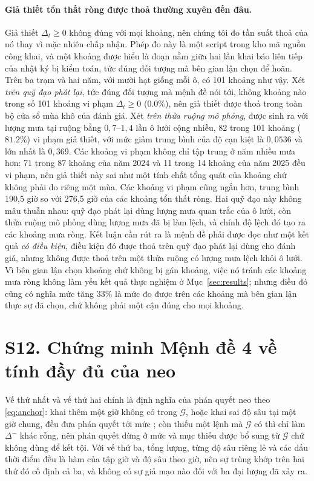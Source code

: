 \paragraph*{Giả thiết tổn thất ròng được thoả thường xuyên đến đâu.}
Giả thiết $\Delta_t\ge0$ không đúng với mọi khoảng, nên chúng tôi đo tần suất
thoả của nó thay vì mặc nhiên chấp nhận. Phép đo này là một script trong kho mã nguồn
công khai, và một khoảng được hiểu là đoạn nằm giữa hai lần khai báo liên tiếp của nhật
ký bị kiểm toán, tức đúng đối tượng mà bên gian lận chọn để hoãn. Trên ba trạm và hai
năm, với mười hạt giống mỗi ô, có 101 khoảng như vậy. Xét \emph{trên quỹ đạo phát lại},
tức đúng đối tượng mà mệnh đề nói tới, không khoảng nào trong số 101 khoảng vi phạm
$\Delta_t\ge0$ ($0.0\%$), nên giả thiết được thoả trong toàn bộ cửa sổ mùa khô của
đánh giá. Xét \emph{trên thửa ruộng mô phỏng}, được sinh ra với lượng mưa tại ruộng bằng
$0{,}7$--$1{,}4$ lần ô lưới cộng nhiễu, 82 trong 101 khoảng ($81.2\%$) vi phạm giả
thiết, với mức giảm trung bình của độ cạn kiệt là $0{,}0536$ và lớn nhất là $0{,}369$.
Các khoảng vi phạm không chỉ tập trung ở năm nhiều mưa hơn: 71 trong 87 khoảng của năm
2024 và 11 trong 14 khoảng của năm 2025 đều vi phạm, nên giả thiết này sai như một tính
chất tổng quát của khoảng chứ không phải do riêng một mùa. Các khoảng vi phạm cũng ngắn
hơn, trung bình 190{,}5 giờ so với 276{,}5 giờ của các khoảng tổn thất ròng. Hai quỹ đạo
này không mâu thuẫn nhau: quỹ đạo phát lại dùng lượng mưa quan trắc của ô lưới, còn thửa
ruộng mô phỏng dùng lượng mưa đã bị làm lệch, và chính độ lệch đó tạo ra các khoảng mưa
ròng. Kết luận cần rút ra là mệnh đề phải được đọc như một kết quả \emph{có điều kiện},
điều kiện đó được thoả trên quỹ đạo phát lại dùng cho đánh giá, nhưng không được thoả
trên một thửa ruộng có lượng mưa lệch khỏi ô lưới. Vì bên gian lận chọn khoảng chứ không
bị gán khoảng, việc nó tránh các khoảng mưa ròng không làm yếu kết quả thực nghiệm ở
Mục~\ref{sec:results}; nhưng điều đó cũng có nghĩa mức tăng $33\%$ là mức đo được trên
các khoảng mà bên gian lận thực sự đã chọn, chứ không
phải một cận đúng cho mọi khoảng.

\section*{S12. Chứng minh Mệnh đề 4 về tính đầy đủ của neo}

Vế thứ nhất và vế thứ hai chính là định nghĩa của phán quyết neo theo
\eqref{eq:anchor}: khai thêm một giờ không có trong $\mathcal{G}$, hoặc khai sai độ sâu
tại một giờ chung, đều đưa phán quyết tới mức ; còn thiếu một lệnh mà
$\mathcal{G}$ có thì chỉ làm $\Delta^{-}$ khác rỗng, nên phán quyết dừng ở mức
 và mục thiếu được bổ sung từ $\mathcal{G}$ chứ không dùng để kết tội.
Với vế thứ ba, tổng lượng, từng độ sâu riêng lẻ và các dấu thời điểm đều là hàm của tập
giờ và độ sâu theo giờ, nên sự trùng khớp trên hai thứ đó cố định cả ba, và không có sự
giả mạo nào đối với ba đại lượng đã xảy ra.

